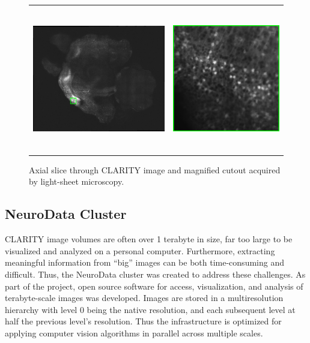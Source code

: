 \documentclass[]{spie}  %
\begin{document}
\begin{figure}[t]
 \begin{center}
  \begin{tabular}{c c}
   \includegraphics[height=2.5in]{clarityWithCutout} & \includegraphics[height=2.5in]{clarityCutout} 
  \end{tabular}
 \end{center}
 \caption{Axial slice through CLARITY image and magnified cutout acquired by light-sheet microscopy.}
 \label{fig:clarity}
\end{figure} 


\subsection{NeuroData Cluster}

CLARITY image volumes are often over 1 terabyte in size, far too large to be visualized and analyzed on a personal computer.
Furthermore, extracting meaningful information from ``big'' images can be both time-consuming and difficult.
Thus, the NeuroData cluster was created to address these challenges.
As part of the project, open source software for access, visualization, and analysis of terabyte-scale images was developed.
Images are stored in a multiresolution hierarchy with level 0 being the native resolution, and each subsequent level at half the previous level's resolution.
Thus the infrastructure is optimized for applying computer vision algorithms in parallel across multiple scales.\cite{Burns13}
\end{document}
